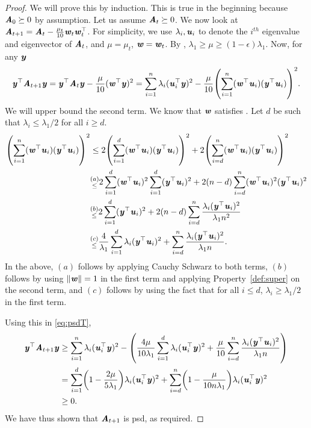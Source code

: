 \begin{proof}
We will prove this by induction. This is true in the beginning because $\AA_0 \succeq 0$ by assumption. Let us assume $\AA_{t}\succeq 0$. We now look at $\AA_{t+1} = \AA_{t}- \frac{\mu_{t}}{10} \ww_{t}\ww_{t}^{\top}$.
 For simplicity, we use $\lambda_i,\uu_i$ to denote the  $i^{th}$ eigenvalue and eigenvector of $\AA_{t}$, and $\mu = \mu_t$, $\ww = \ww_t$. By , $\lambda_1 \geq \mu \geq (1-\epsilon)\lambda_1$. Now, for any $\yy$
\begin{equation}\label{eq:psdT}
\yy^{\top}\AA_{t+1}\yy = \yy^{\top}\AA_{t}\yy - \frac{\mu}{10} (\ww^{\top}\yy)^2 = \sum_{i=1}^n \lambda_i (\uu_i^{\top}\yy)^2 -  \frac{\mu}{10}\left(\sum_{i=1}^n (\ww^{\top}\uu_i)(\yy^{\top}\uu_i)\right)^2 .
\end{equation}
We will upper bound the second term. We know that $\ww$ satisfies . Let $d$ be such that $\lambda_i \leq \lambda_1/2$ for all $i \geq d$.
\begin{align*}
\left(\sum_{i=1}^n (\ww^{\top}\uu_i)(\yy^{\top}\uu_i)\right)^2 & \leq 2 \left(\sum_{i=1}^d(\ww^{\top}\uu_i)(\yy^{\top}\uu_i)\right)^2 + 2 \left(\sum_{i=d}^n(\ww^{\top}\uu_i)(\yy^{\top}\uu_i)\right)^2\\
& \substack{(a)\\ \leq} 2 \sum_{i=1}^d (\ww^{\top}\uu_i)^2\sum_{i=1}^d (\yy^{\top}\uu_i)^2 + 2(n-d) \sum_{i=d}^n  (\ww^{\top}\uu_i)^2(\yy^{\top}\uu_i)^2\\
& \substack{(b)\\ \leq} 2 \sum_{i=1}^d (\yy^{\top}\uu_i)^2 + 2(n-d)\sum_{i=d}^n \frac{\lambda_i(\yy^{\top}\uu_i)^2}{\lambda_1 n^2}\\
& \substack{(c)\\ \leq}  \frac{4}{\lambda_1}\sum_{i=1}^d \lambda_i(\yy^{\top}\uu_i)^2 + \sum_{i=d}^n \frac{\lambda_i(\yy^{\top}\uu_i)^2}{\lambda_1 n}.
\end{align*}
In the above, $(a)$ follows by applying Cauchy Schwarz to both terms, $(b)$ follows by using $\|\ww\| = 1$ in the first term and applying Property~\ref{def:super} on the second term, and $(c)$ follows by using the fact that for all $i \leq d$, $\lambda_i \geq \lambda_1/2$ in the first term. 

Using this in \eqref{eq:psdT},
\begin{align*}
\yy^{\top}\AA_{t+1}\yy & \geq \sum_{i=1}^n \lambda_i (\uu_i^{\top}\yy)^2 - \left(\frac{4\mu}{10\lambda_1}\sum_{i=1}^d \lambda_i (\uu_i^{\top}\yy)^2 + \frac{\mu}{10}\sum_{i=d}^n \frac{\lambda_i(\yy^{\top}\uu_i)^2}{\lambda_1 n}\right)\\
& = \sum_{i=1}^d \left(1 - \frac{2\mu}{5\lambda_1}\right)\lambda_i (\uu_i^{\top}\yy)^2  + \sum_{i=d}^n \left(1 - \frac{\mu}{10n\lambda_1}\right)\lambda_i (\uu_i^{\top}\yy)^2  \\
& \geq 0.
\end{align*}
We have thus shown that $\AA_{t+1}$ is psd, as required.
\end{proof}


